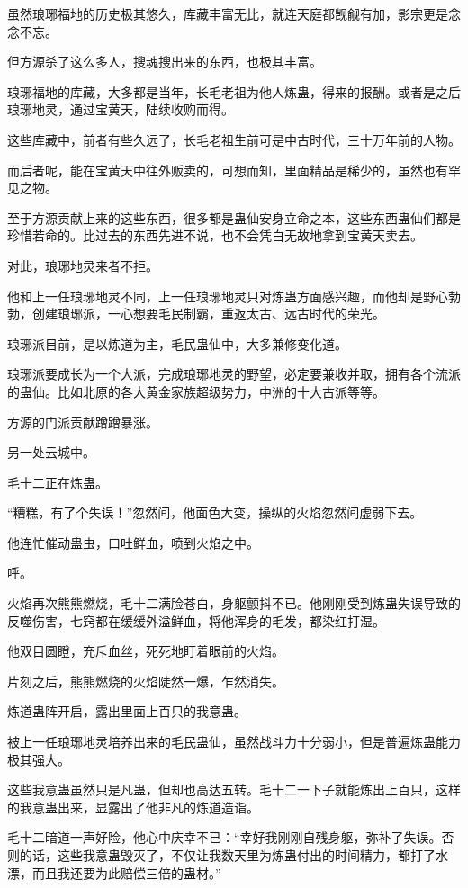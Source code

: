 \begin{this_body}
虽然琅琊福地的历史极其悠久，库藏丰富无比，就连天庭都觊觎有加，影宗更是念念不忘。

但方源杀了这么多人，搜魂搜出来的东西，也极其丰富。

琅琊福地的库藏，大多都是当年，长毛老祖为他人炼蛊，得来的报酬。或者是之后琅琊地灵，通过宝黄天，陆续收购而得。

这些库藏中，前者有些久远了，长毛老祖生前可是中古时代，三十万年前的人物。

而后者呢，能在宝黄天中往外贩卖的，可想而知，里面精品是稀少的，虽然也有罕见之物。

至于方源贡献上来的这些东西，很多都是蛊仙安身立命之本，这些东西蛊仙们都是珍惜若命的。比过去的东西先进不说，也不会凭白无故地拿到宝黄天卖去。

对此，琅琊地灵来者不拒。

他和上一任琅琊地灵不同，上一任琅琊地灵只对炼蛊方面感兴趣，而他却是野心勃勃，创建琅琊派，一心想要毛民制霸，重返太古、远古时代的荣光。

琅琊派目前，是以炼道为主，毛民蛊仙中，大多兼修变化道。

琅琊派要成长为一个大派，完成琅琊地灵的野望，必定要兼收并取，拥有各个流派的蛊仙。比如北原的各大黄金家族超级势力，中洲的十大古派等等。

方源的门派贡献蹭蹭暴涨。

另一处云城中。

毛十二正在炼蛊。

“糟糕，有了个失误！”忽然间，他面色大变，操纵的火焰忽然间虚弱下去。

他连忙催动蛊虫，口吐鲜血，喷到火焰之中。

呼。

火焰再次熊熊燃烧，毛十二满脸苍白，身躯颤抖不已。他刚刚受到炼蛊失误导致的反噬伤害，七窍都在缓缓外溢鲜血，将他浑身的毛发，都染红打湿。

他双目圆瞪，充斥血丝，死死地盯着眼前的火焰。

片刻之后，熊熊燃烧的火焰陡然一爆，乍然消失。

炼道蛊阵开启，露出里面上百只的我意蛊。

被上一任琅琊地灵培养出来的毛民蛊仙，虽然战斗力十分弱小，但是普遍炼蛊能力极其强大。

这些我意蛊虽然只是凡蛊，但却也高达五转。毛十二一下子就能炼出上百只，这样的我意蛊出来，显露出了他非凡的炼道造诣。

毛十二暗道一声好险，他心中庆幸不已：“幸好我刚刚自残身躯，弥补了失误。否则的话，这些我意蛊毁灭了，不仅让我数天里为炼蛊付出的时间精力，都打了水漂，而且我还要为此赔偿三倍的蛊材。”


\end{this_body}
